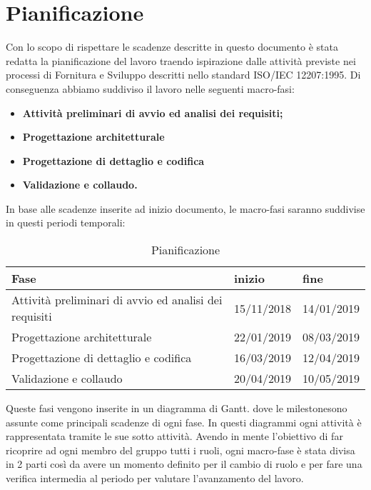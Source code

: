 \section{Pianificazione}

Con lo scopo di rispettare le scadenze descritte in questo documento è stata redatta la pianificazione del lavoro traendo ispirazione dalle attività previste nei processi di Fornitura e Sviluppo descritti nello standard ISO/IEC 12207:1995. Di conseguenza abbiamo suddiviso il lavoro nelle seguenti macro-fasi:
\begin{itemize}
	\item{\textbf{Attività preliminari di avvio ed analisi dei requisiti;}}
	\item{\textbf{Progettazione architetturale}}
	\item{\textbf{Progettazione di dettaglio e codifica}}
	\item{\textbf{Validazione e collaudo.}}
\end{itemize} 
In base alle scadenze inserite ad inizio documento, le macro-fasi saranno suddivise in questi periodi temporali:
\newline
\begin{table}[!htpb]
	\centering
	\renewcommand{\arraystretch}{2} 
	\begin{tabular}{|l|l|l|}
		\hline
		\rowcolor{orange!50}
		\textbf{Fase} & \textbf{inizio} & \textbf{fine}\\
		\hline
		Attività preliminari di avvio ed analisi dei requisiti & 15/11/2018 & 14/01/2019 \\
		\hline
		Progettazione architetturale & 22/01/2019 & 08/03/2019\\
		\hline
		Progettazione di dettaglio e codifica & 16/03/2019 & 12/04/2019\\
		\hline
		Validazione e collaudo & 20/04/2019 & 10/05/2019\\
		\hline
	\end{tabular}
	\caption{Pianificazione}
\end{table}
\newline Queste fasi vengono inserite in un diagramma di Gantt\pedice. dove le milestone\pedice sono assunte come principali scadenze di ogni fase. In questi diagrammi ogni attività è rappresentata tramite le sue sotto attività.
\newline Avendo in mente l'obiettivo di far ricoprire ad ogni membro del gruppo tutti i ruoli, ogni macro-fase è stata divisa in 2 parti così da avere un momento definito per il cambio di ruolo e per fare una verifica intermedia al periodo per valutare l'avanzamento del lavoro. 


\clearpage

\clearpage

\clearpage

\clearpage

